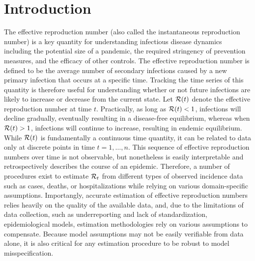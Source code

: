 \section{Introduction}
\label{sec:intro}

The effective reproduction number (also called the instantaneous reproduction
number) is a key quantity for understanding infectious disease dynamics including
the potential size of a pandemic, the required stringency of prevention measures,
and the efficacy of other controls. 
The effective reproduction number is defined to be the average number of
secondary infections caused by a new primary infection that occurs at a specific
time. Tracking the time series of this quantity
is therefore useful for understanding whether or not future infections are
likely to increase or decrease from the current state.
Let $\mathcal{R}(t)$ denote the effective reproduction number at time $t$. Practically,
as long as $\mathcal{R}(t) < 1$, infections will decline gradually, eventually
resulting in a disease-free equilibrium, whereas when $\mathcal{R}(t)
> 1$, infections will continue to increase, resulting in endemic
equilibrium. 
%
While $\mathcal{R}(t)$ is fundamentally a continuous time quantity, it can be related
to data only at discrete points in time $t = 1,\ldots,n$.
This sequence of effective reproduction numbers over time is not observable, but
nonetheless is easily interpretable and retrospectively describes the course of
an epidemic. Therefore, a number of procedures exist to estimate $\mathcal{R}_t$ from
different types of observed incidence data such as cases, deaths, or
hospitalizations while relying on various domain-specific assumptions.
Importangly, accurate estimation of effective reproduction numbers relies
heavily on the quality of the available data, and, due to the limitations of
data collection, such as underreporting and lack of standardization,
epidemiological models, estimation methodologies rely on various assumptions to
compensate. Because model assumptions may not be easily verifiable from data
alone, it is also critical for any estimation procedure to be robust to model
misspecification. 

